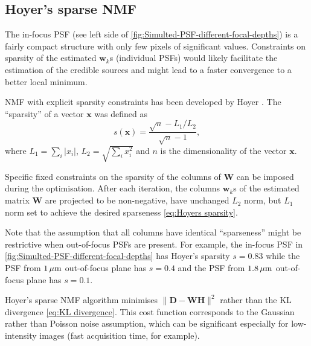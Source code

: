 
\subsection{Hoyer's sparse NMF \label{sub:Hoyer}}
The in-focus PSF (see left side of \autoref{fig:Simulted-PSF-different-focal-depths}) is a fairly compact structure with only few pixels of significant values. Constraints on sparsity of the estimated $\bm{w}_k$s (individual PSFs) would likely facilitate the estimation of the credible sources and might lead to a faster convergence to a better local minimum. 

NMF with explicit sparsity constraints has been developed by Hoyer \cite{Hoyer2004}. The ``sparsity'' of a vector $\bm{x}$ was defined as 
%
\begin{equation}
	s(\bm{x})=\frac{\sqrt{n}-L_1/L_2}{\sqrt{n}-1},
	\label{eq:Hoyers sparsity}
\end{equation}
%
where $L_1=\sum_i|x_i|$, $L_2=\sqrt{\sum_i x^2_i}$ and $n$ is the dimensionality of the vector $\bm{x}$.

Specific fixed constraints on the sparsity of the columns of $\bm{W}$ can be imposed during the optimisation. After each iteration, the columns $\bm{w}_k$s of the estimated matrix $\bm{W}$ are projected to be non-negative, have unchanged $L_2$ norm, but $L_1$ norm set to achieve the desired sparseness \autoref{eq:Hoyers sparsity}.

Note that the assumption that all columns have identical ``sparseness'' might be restrictive when out-of-focus PSFs are present. For example, the in-focus PSF in \autoref{fig:Simulted-PSF-different-focal-depths} has Hoyer's sparsity $s=0.83$ while the PSF from $1 \, \mathrm{\mu m}$ out-of-focus plane has $s=0.4$ and the PSF from $1.8 \, \mathrm{\mu m}$ out-of-focus plane  has $s=0.1$.

Hoyer's sparse NMF algorithm minimises $\|\bm{D} - \bm{WH}\|^2$ rather than the KL divergence \autoref{eq:KL divergence}. This cost function corresponds to the Gaussian rather than Poisson noise assumption, which can be significant especially for low-intensity images (fast acquisition time, for example). 

